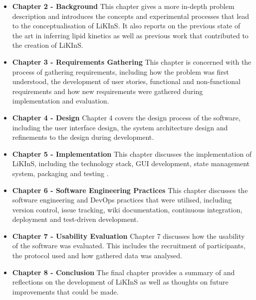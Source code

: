 \documentclass{l4proj}
\begin{document}
\begin{itemize}
    \item \textbf{Chapter 2 - Background}\newline
    This chapter gives a more in-depth problem description and introduces the concepts and experimental processes that lead to the conceptualisation of LiKInS. It also reports on the previous state of the art in inferring lipid kinetics as well as previous work that contributed to the creation of LiKInS.
    \item \textbf{Chapter 3 - Requirements Gathering}\newline
    This chapter is concerned with the process of gathering requirements, including how the problem was first understood, the development of user stories, functional and non-functional requirements and how new requirements were gathered during implementation and evaluation.
    \item \textbf{Chapter 4 - Design}\newline
    Chapter 4 covers the design process of the software, including the user interface design, the system architecture design and refinements to the design during development.
    \item \textbf{Chapter 5 - Implementation}\newline
    This chapter discusses the implementation of LiKInS, including the technology stack, GUI development, state management system, packaging and testing
    .
    \item \textbf{Chapter 6 - Software Engineering Practices}\newline
    This chapter discusses the software engineering and DevOps practices that were utilised, including version control, issue tracking, wiki documentation, continuous integration, deployment and test-driven development. 
    \item \textbf{Chapter 7 - Usability Evaluation}\newline
    Chapter 7 discusses how the usability of the software was evaluated. This includes the recruitment of participants, the protocol used and how gathered data was analysed.
    \item \textbf{Chapter 8 - Conclusion}\newline
    The final chapter provides a summary of and reflections on the development of LiKInS as well as thoughts on future improvements that could be made.
    
\end{itemize}
\end{document}
